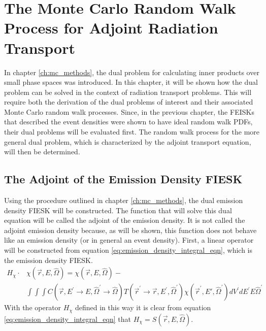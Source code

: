 \chapter{The Monte Carlo Random Walk Process for Adjoint Radiation Transport}
\label{ch:adjoint_particle_transport}
In chapter \ref{ch:mc_methods}, the dual problem for calculating inner products
over small phase spaces was introduced. In this chapter, it will be shown how
the dual problem can be solved in the context of radiation transport 
problems. This will require both the derivation of the dual problems of interest
and their associated Monte Carlo random walk processes. Since, in the previous
chapter, the FEISKs that described the event densities were shown to have 
ideal random walk PDFs, their dual problems will be evaluated first. The 
random walk process for the more general dual problem, which is characterized
by the adjoint transport equation, will then be determined. 

\section{The Adjoint of the Emission Density FIESK}
Using the procedure outlined in chapter \ref{ch:mc_methods}, the dual emission
density FIESK will be constructed. The function that will solve this dual 
equation will be called the adjoint of the emission density. It is not called
the adjoint emission density because, as will be shown, this function does
not behave like an emission density (or in general an event density). First, 
a linear operator will be constructed from equation 
\ref{eq:emission_density_integral_eqn}, which is the emission density FIESK. 
\begin{equation}
  \begin{split}
    H_{\chi} \cdot &\chi(\vec{r},E,\hat{\Omega}) = 
    \chi(\vec{r},E,\hat{\Omega}) - \\
    & \int\int\int C(\vec{r},E^{'} \to E,\hat{\Omega}^{'} \to \hat{\Omega})
    T(\vec{r}^{'} \to \vec{r},E^{'},\hat{\Omega}^{'}) 
    \chi(\vec{r}^{'},E',\hat{\Omega}^{'}) dV^{'}dE^{'}E\hat{\Omega}^{'}
  \end{split}
\end{equation}
With the operator $H_{\chi}$ defined in this way it is clear from equation
\ref{eq:emission_density_integral_eqn} that 
$H_{\chi} = S(\vec{r},E,\hat{\Omega})$.

